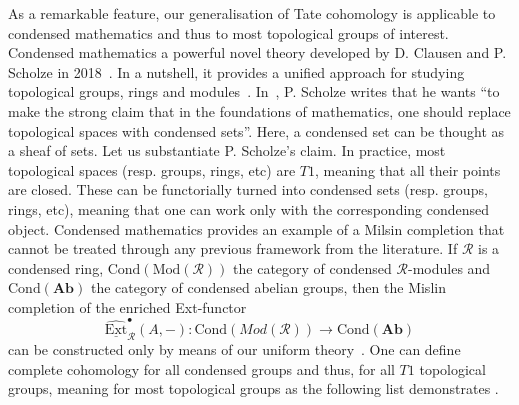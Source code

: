 \documentclass[12pt, a4paper]{article}
\numberwithin{equation}{section}
\theoremstyle{empty}
\theoremstyle{nonumberplain}
\begin{document}
As a remarkable feature, our generalisation of Tate cohomology is applicable to condensed mathematics and thus to most topological groups of interest. Condensed mathematics a powerful novel theory developed by D.\! Clausen and P.\! Scholze in 2018~\cite{sch19}. In a nutshell, it provides a unified approach for studying topological groups, rings and modules~\cite[p.~6]{sch19}. In~\cite{sch20}, P.\! Scholze writes that he wants ``to make the strong claim that in the foundations of mathematics, one should replace topological spaces with condensed sets''. Here, a condensed set can be thought as a sheaf of sets. Let us substantiate P.\! Scholze's claim. In practice, most topological spaces (resp.\! groups, rings, etc) are $T1$, meaning that all their points are closed. These can be functorially turned into condensed sets (resp.\! groups, rings, etc), meaning that one can work only with the corresponding condensed object. Condensed mathematics provides an example of a Milsin completion that cannot be treated through any previous framework from the literature. If $\mathcal{R}$ is a condensed ring, $\mathrm{Cond}(\mathrm{Mod}(\mathcal{R}))$ the category of condensed $\mathcal{R}$-modules and $\mathrm{Cond}(\mathbf{Ab})$ the category of condensed abelian groups, then the  Mislin completion of the enriched Ext-functor
\[ \underline{\widehat{\mathrm{Ext}}}_{\mathcal{R}}^{\bullet}(A, -): \mathrm{Cond}(Mod(\mathcal{R})) \rightarrow \mathrm{Cond}(\mathbf{Ab}) \]
can be constructed only by means of our uniform theory~\cite[Remark~7.2]{ghe24}. One can define complete cohomology for all condensed groups and thus, for all $T1$ topological groups, meaning for most topological groups as the following list demonstrates \cite[Theorem~7.1]{ghe24}.
\end{document}

